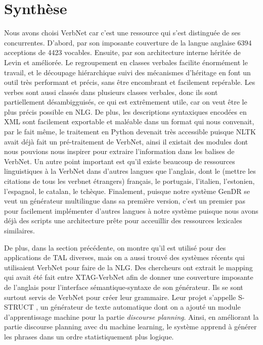 
\section{Synthèse}

Nous avons choisi VerbNet car c'est une ressource qui s'est distinguée de ses concurrentes. D'abord, par son imposante couverture de la langue anglaise 6394 acceptions de 4423 vocables. Ensuite, par son architecture interne héritée de Levin et améliorée. Le regroupement en classes verbales facilite énormément le travail, et le découpage hiérarchique suivi des mécanismes d'héritage en font un outil très performant et précis, sans être encombrant et facilement repérable. Les verbes sont aussi classés dans plusieurs classes verbales, donc ils sont partiellement désambigguisés, ce qui est extrêmement utile, car on veut être le plus précis possible en NLG. De plus, les descriptions syntaxiques encodées en XML sont facilement exportable et maléable dans un format qui nous convenait, par le fait même, le traitement en Python devenait très accessible puisque NLTK avait déjà fait un pré-traitement de VerbNet, ainsi il existait des modules dont nous pouvions nous inspirer pour extraire l'information dans les balises de VerbNet. Un autre point important est qu'il existe beaucoup de ressources linguistiques à la VerbNet dans d'autres langues que l'anglais, dont le (mettre les citations de tous les verbnet étrangers) français, le portugais, l'italien, l'estonien, l'espagnol, le catalan, le tchèque. Finalement, puisque notre système GenDR se veut un générateur multilingue dans sa première version, c'est un premier pas pour facilement implémenter d'autres langues à notre système puisque nous avons déjà des scripts une architecture prête pour acceuillir des ressources lexicales similaires. 

De plus, dans la section précédente, on montre qu'il est utilisé pour des applications de TAL diverses, mais on a aussi trouvé des systèmes récents qui utilisaient VerbNet pour faire de la NLG. Des chercheurs ont extrait le mapping qui avait été fait entre XTAG-VerbNet afin de donner une couverture imposante de l'anglais pour l'interface sémantique-syntaxe de son générateur. Ils se sont surtout servis de VerbNet pour créer leur grammaire. Leur projet s'appelle S-STRUCT \citep{PfeilAlgorithmsResourcesScalable2016}, un générateur de texte automatique dont on a ajouté un module d'apprentissage machine pour la partie \emph{discourse planning}. Ainsi, en améliorant la partie discourse planning avec du machine learning, le système apprend à générer les phrases dans un ordre statistiquement plus logique.

